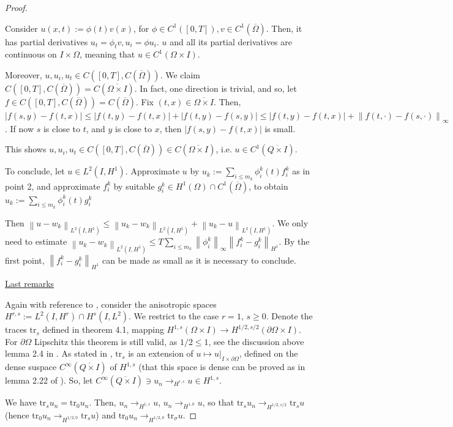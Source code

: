 \documentclass[english,a4paper,9pt,oneside]{scrbook}	%
\theoremstyle{break}
\newenvironment{mproof}[1][\proofname]{%
  \begin{proof}[#1]$ $\par\nobreak\ignorespaces
}{%
  \end{proof}
}
\renewcommand*{\proofname}{Proof}
\theoremstyle{remark}
\newcommand{\ds}{\displaystyle}
\newcommand{\norm}[1]{\left\lVert#1\right\rVert}
\newcommand{\tr}{\text{tr}}
\begin{document}
\begin{appendices}
\begin{mproof}
Consider $u(x,t):=\phi(t)v(x)$, for $\phi \in C^1([0,T]), v \in C^1(\overline{\Omega})$. Then, it has partial derivatives $u_t = \phi_t v, u_i = \phi u_i$. $u$ and all its partial derivatives are continuous on $I\times \Omega$, meaning that $u \in C^1(\Omega \times I)$.

Moreover, $u, u_i, u_t \in C([0,T], C(\overline{\Omega}))$. We claim $ C([0,T], C(\overline{\Omega})) = C(\overline{\Omega\times I})$. In fact, one direction is trivial, and so, let $f \in C([0,T], C(\overline{\Omega})) = C(\overline{\Omega})$. Fix $(t,x) \in \overline{\Omega\times I}$. Then, $|f(s,y)-f(t,x)|\leq |f(t,y)-f(t,x)|+|f(t,y)-f(s,y)|\leq  |f(t,y)-f(t,x)|+\norm{f(t, \cdot)-f(s,\cdot)}_{\infty}$. If now $s$ is close to $t$, and $y$ is close to $x$, then $|f(s,y)-f(t,x)|$ is small.

This shows $u, u_i, u_t \in C([0,T], C(\overline{\Omega})) \in C(\overline{\Omega\times I}) $, i.e. $u \in C^1(\overline{Q\times I})$.

To conclude, let $u \in L^2(I,H^1)$. Approximate $u$ by $u_k:=\sum_{i\leq m_k} \phi_i^k(t)f_i^k$ as in point 2, and approximate $f_i^k$ by suitable $g_i^k \in H^1(\Omega)\cap C^1(\overline{\Omega})$, to obtain $u_k:=\sum_{i\leq m_k} \phi_i^k(t)g_i^k$

Then $\norm{u-w_k}_{L^2(I,H^1)}\leq \norm{u_k-w_k}_{L^2(I,H^1)}+\norm{u_k-u}_{L^2(I,H^1)}$. We only need to estimate $ \norm{u_k-w_k}_{L^2(I,H^1)}\leq\ds  T \sum_{i\leq m_k} \norm{\phi_i^k}_\infty\norm{f_i^k-g_i^k}_{H^1}$. By the first point, $\norm{f_i^k-g_i^k}_{H^1}$ can be made as small as it is necessary to conclude.

\underline{Last remarks}

Again with reference to \cite{lions}, consider the anisotropic spaces $H^{r,s}:=L^2(I,H^r)\cap H^s(I,L^2)$. We restrict to the case $r = 1$, $s\geq 0$. Denote the traces $\tr_s$ defined in theorem 4.1, mapping $H^{1,s}(\Omega \times I)\rightarrow H^{1/2, s/2}(\partial \Omega \times I)$. For $\partial \Omega$ Lipschitz this theorem is still valid, as $1/2\leq 1$, see the discussion above lemma 2.4 in \cite{costabel}. As stated in \cite{lions}, $\tr_s$ is an extension of  $u\mapsto u|_{I\times \partial \Omega}$, defined on the dense suspace $C^\infty(\overline{Q\times I})$ of $H^{1,s}$ (that this space is dense can be proved as in lemma 2.22 of \cite{costabel}). So, let $C^\infty(\overline{Q\times I})\ni u_n \rightarrow_{H^{r,s}} u \in H^{1,s}$.
 
We have $\tr_s u_n = \tr_0 u_n$. Then, $u_n \rightarrow_{H^{1,s}} u$, $u_n \rightarrow_{H^{1,0}} u$, so that $\tr_s u_n \rightarrow_{H^{1/2,s/2}}\tr_s u$ (hence $\tr_0 u_n \rightarrow_{H^{1/2,0}}\tr_s u$) and $\tr_0 u_n  \rightarrow_{H^{1/2,0}} \tr_\sigma u$.


\end{mproof}
\end{appendices}
\end{document}
